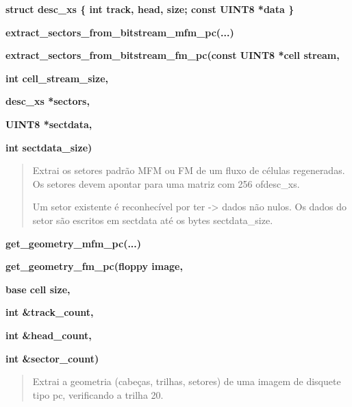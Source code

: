 \documentclass[letterpaper,10pt,brazil]{sphinxmanual}
\begin{document}
\begin{DUlineblock}{0em}
\item[] \textbf{struct desc\_xs \{ int track, head, size; const UINT8 *data \}}
\item[] \textbf{extract\_sectors\_from\_bitstream\_mfm\_pc(...)}
\item[] \textbf{extract\_sectors\_from\_bitstream\_fm\_pc(const UINT8 *cell stream,}
\item[]
\begin{DUlineblock}{\DUlineblockindent}
\item[] \textbf{int cell\_stream\_size,}
\item[] \textbf{desc\_xs *sectors,}
\item[] \textbf{UINT8 *sectdata,}
\item[] \textbf{int sectdata\_size)}
\end{DUlineblock}
\end{DUlineblock}
\begin{quote}

Extrai os setores padrão MFM ou FM de um fluxo de células regeneradas.
Os setores devem apontar para uma matriz com 256 ofdesc\_xs.

Um setor existente é reconhecível por ter -\textgreater{} dados não nulos.
Os dados do setor são escritos em sectdata até os bytes sectdata\_size.
\end{quote}

\begin{DUlineblock}{0em}
\item[] \textbf{get\_geometry\_mfm\_pc(...)}
\item[] \textbf{get\_geometry\_fm\_pc(floppy image,}
\item[]
\begin{DUlineblock}{\DUlineblockindent}
\item[] \textbf{base cell size,}
\item[] \textbf{int \&track\_count,}
\item[] \textbf{int \&head\_count,}
\item[] \textbf{int \&sector\_count)}
\end{DUlineblock}
\end{DUlineblock}
\begin{quote}

Extrai a geometria (cabeças, trilhas, setores) de uma imagem de
disquete tipo pc, verificando a trilha 20.
\end{quote}
\end{document}
